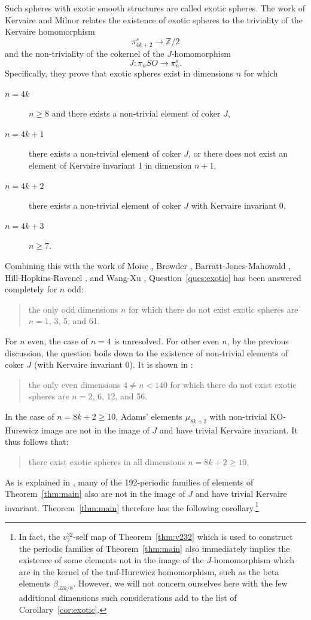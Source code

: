 \documentclass[10pt]{amsart}
\newcommand{\mr}[1]{\mathrm{#1}}
\newcommand{\ZZ}{\mathbb{Z}}
\newcommand{\tmf}{\mathrm{tmf}}
\newcommand{\KO}{\mr{KO}}
\theoremstyle{definition}
\numberwithin{equation}{section}
\numberwithin{figure}{section}
\begin{document}
Such spheres with exotic smooth structures are called exotic spheres.
The work of Kervaire and Milnor \cite{KervaireMilnor} relates the existence of exotic spheres to the triviality of the Kervaire homomorphism
$$ \pi_{4k+2}^s \rightarrow \ZZ/2 $$
and the non-triviality of the cokernel of the $J$-homomorphism
$$ J: \pi_n SO \rightarrow \pi^s_{n}. $$
Specifically, they prove that exotic spheres exist in dimensions $n$ for which
\begin{description}
\item[$n = 4k$] $n \ge 8$ and there exists a non-trivial element of coker $J$, 
\item[$n = 4k+1$] there exists a non-trivial element of coker $J$, or there does not exist an element of Kervaire invariant 1 in dimension $n+1$,
\item[$n = 4k+2$] there exists a non-trivial element of coker $J$ with Kervaire invariant $0$,
\item[$n = 4k+3$] $n \ge 7$.
\end{description}
Combining this with the work of Moise \cite{Moise}, Browder \cite{Browder}, Barratt-Jones-Mahowald \cite{BJM}, Hill-Hopkins-Ravenel \cite{HHR}, and Wang-Xu \cite{WangXu}, Question~\ref{ques:exotic} has been answered completely for $n$ odd:
\begin{quote}
the only odd dimensions $n$ for which there do not exist exotic spheres are $n = 1$, 3, 5, and 61.
\end{quote}
For $n$ even, the case of $n = 4$ is unresolved.  For other even $n$, by the previous discussion, the question boils down to the existence of non-trivial elements of coker $J$ (with Kervaire invariant 0).  It is shown in \cite{BHHM2}:
\begin{quote}
the only even dimensions $4 \ne n < 140$ for which there do not exist exotic spheres are $n = 2$, 6, 12, and 56. 
\end{quote}
In the case of $n = 8k+2 \ge 10$, Adams' elements $\mu_{8k+2}$ with non-trivial $\KO$-Hurewicz image are not in the image of $J$ and have trivial Kervaire invariant.  It thus follows that:
\begin{quote}
there exist exotic spheres in all dimensions $n = 8k+2 \ge 10$. 
\end{quote}
As is explained in \cite{BHHM2}, many of the 192-periodic families of elements of Theorem~\ref{thm:main} also are not in the image of $J$ and have trivial Kervaire invariant.  Theorem~\ref{thm:main} therefore has the following corollary.\footnote{In fact, the $v_2^{32}$-self map of Theorem~\ref{thm:v232} which is used to construct the periodic families of Theorem~\ref{thm:main} also immediately implies the existence of some elements not in the image of the $J$-homomorphism which are in the kernel of the $\tmf$-Hurewicz homomorphism, such as the beta elements $\beta_{32k/8}$. However, we will not concern ourselves here with the few additional dimensions such considerations add to the list of Corollary~\ref{cor:exotic}.}
\end{document}

